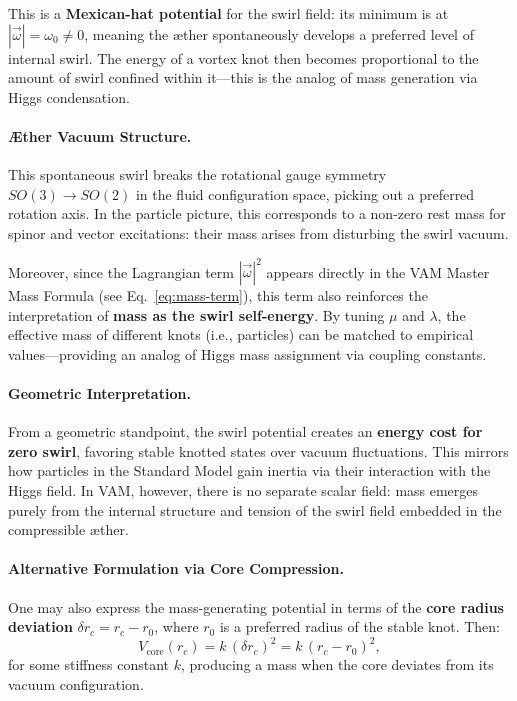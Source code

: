 \documentclass[a4paper,12pt]{article}
\begin{document}
This is a \textbf{Mexican-hat potential} for the swirl field: its minimum is at \( |\vec{\omega}| = \omega_0 \neq 0 \), meaning the æther spontaneously develops a preferred level of internal swirl. The energy of a vortex knot then becomes proportional to the amount of swirl confined within it—this is the analog of mass generation via Higgs condensation.

\vspace{0.5em}
\paragraph{Æther Vacuum Structure.}
This spontaneous swirl breaks the rotational gauge symmetry \( SO(3) \rightarrow SO(2) \) in the fluid configuration space, picking out a preferred rotation axis. In the particle picture, this corresponds to a non-zero rest mass for spinor and vector excitations: their mass arises from disturbing the swirl vacuum.

Moreover, since the Lagrangian term \( |\vec{\omega}|^2 \) appears directly in the VAM Master Mass Formula (see Eq.~\ref{eq:mass-term}), this term also reinforces the interpretation of \textbf{mass as the swirl self-energy}. By tuning \( \mu \) and \( \lambda \), the effective mass of different knots (i.e., particles) can be matched to empirical values—providing an analog of Higgs mass assignment via coupling constants.

\vspace{0.5em}
\paragraph{Geometric Interpretation.}
From a geometric standpoint, the swirl potential creates an \textbf{energy cost for zero swirl}, favoring stable knotted states over vacuum fluctuations. This mirrors how particles in the Standard Model gain inertia via their interaction with the Higgs field. In VAM, however, there is no separate scalar field: mass emerges purely from the internal structure and tension of the swirl field embedded in the compressible æther.

\vspace{0.5em}
\paragraph{Alternative Formulation via Core Compression.}
One may also express the mass-generating potential in terms of the \textbf{core radius deviation} \( \delta r_c = r_c - r_0 \), where \( r_0 \) is a preferred radius of the stable knot. Then:
\begin{equation}
    V_{\text{core}}(r_c) = k\, (\delta r_c)^2 = k\, (r_c - r_0)^2,
\end{equation}
for some stiffness constant \( k \), producing a mass when the core deviates from its vacuum configuration.
\end{document}
